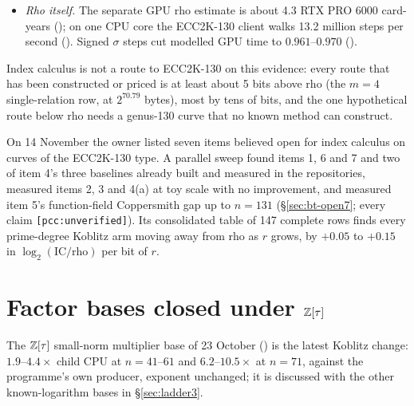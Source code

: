 \begin{itemize}
  largest published Weil-descent discrete logarithm is at genus 31 over
  $\FF_{32}$ (\S\ref{sec:transfer})
  (, with the
  magic-number correction of
  ). The
  $N=130$ counterfactual is genus 255 at a modelled $2^{55.60}$ against rho's
  $2^{60.31}$, and measuring one relation trial turns that margin negative
  (\S\ref{sec:ladder3}). The best explicit curve construction reaches genus
  $2^{28.92}$
  ().
  The isogeny class has 262 curves of conductor gap 263 and no measured
  level effect (\S\ref{sec:transfer}); rho on the degree-263 leaves keeps
  only the negation map, an $11.45\times$ penalty
  ().
\item \emph{Rho itself.} The separate GPU rho estimate is about 4.3 RTX PRO
  6000 card-years (); on one CPU core the ECC2K-130
  client walks 13.2 million steps per second
  (). Signed $\sigma$ steps
  cut modelled GPU time to $0.961$--$0.970$
  ().
\end{itemize}
Index calculus is not a route to ECC2K-130 on this evidence: every route
that has been constructed or priced is at least about 5 bits above rho (the
$m=4$ single-relation row, at $2^{70.79}$ bytes), most by tens of bits, and
the one hypothetical route below rho needs a genus-130 curve that no known
method can construct.

On 14 November the owner listed seven items believed open for index
calculus on curves of the ECC2K-130 type. A parallel sweep found items 1,
6 and 7 and two of item 4's three baselines already built and measured in
the repositories, measured items 2, 3 and 4(a) at toy scale with no
improvement, and measured item 5's function-field Coppersmith gap up to
$n=131$ (\S\ref{sec:bt-open7}; every claim \texttt{[pcc:unverified]}). Its
consolidated table of 147 complete rows finds every prime-degree Koblitz
arm moving away from rho as $r$ grows, by $+0.05$ to $+0.15$ in
$\log_2(\text{IC}/\text{rho})$ per bit of $r$.

\section{Factor bases closed under $\mathbb{Z}[\tau]$}

The $\mathbb{Z}[\tau]$ small-norm multiplier base of 23 October
() is the latest Koblitz
change: $1.9$--$4.4\times$ child CPU at $n=41$--$61$ and $6.2$--$10.5\times$
at $n=71$, against the programme's own producer, exponent unchanged; it is
discussed with the other known-logarithm bases in \S\ref{sec:ladder3}.
